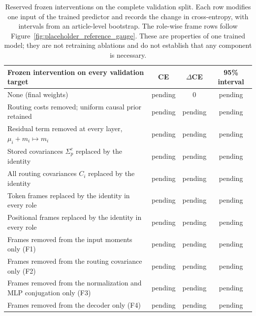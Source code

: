 \documentclass[twoside,11pt]{article}
\begin{document}
\begin{table}[htbp]
\centering
\small
\begin{tabularx}{\textwidth}{@{}>{\raggedright\arraybackslash}Xccc@{}}
\toprule
Frozen intervention on every validation target & CE & $\Delta$CE & 95\% interval \\
\midrule
None (final weights) & pending & 0 & pending \\
Routing costs removed; uniform causal prior retained & pending & pending & pending \\
Residual term removed at every layer, $\mu_i+m_i\mapsto m_i$ & pending & pending & pending \\
Stored covariances $\Sigma_p^c$ replaced by the identity & pending & pending & pending \\
All routing covariances $C_i$ replaced by the identity & pending & pending & pending \\
Token frames replaced by the identity in every role & pending & pending & pending \\
Positional frames replaced by the identity in every role & pending & pending & pending \\
Frames removed from the input moments only (F1) & pending & pending & pending \\
Frames removed from the routing covariance only (F2) & pending & pending & pending \\
Frames removed from the normalization and MLP conjugation only (F3) & pending & pending & pending \\
Frames removed from the decoder only (F4) & pending & pending & pending \\
\bottomrule
\end{tabularx}
\caption{Reserved frozen interventions on the complete validation split. Each row modifies one input of the trained predictor and records the change in cross-entropy, with intervals from an article-level bootstrap. The role-wise frame rows follow Figure~\ref{fig:placeholder_reference_gauge}. These are properties of one trained model; they are not retraining ablations and do not establish that any component is necessary.}
\label{tab:placeholder_interventions}
\end{table}

\clearpage


\end{document}
